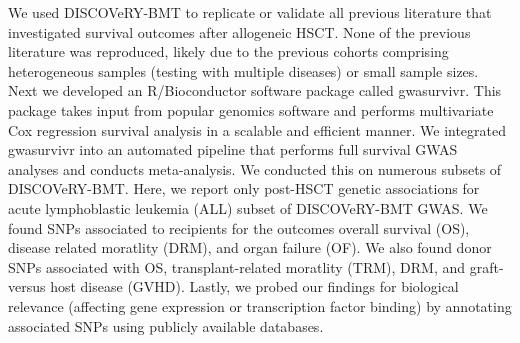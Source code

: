 \documentclass[]{DissertateOSU}
\begin{document}
We used DISCOVeRY-BMT to replicate or validate all previous literature
that investigated survival outcomes after allogeneic HSCT. None of the
previous literature was reproduced, likely due to the previous cohorts
comprising heterogeneous samples (testing with multiple diseases) or
small sample sizes. Next we developed an R/Bioconductor software package
called gwasurvivr. This package takes input from popular genomics
software and performs multivariate Cox regression survival analysis in a
scalable and efficient manner. We integrated gwasurvivr into an
automated pipeline that performs full survival GWAS analyses and
conducts meta-analysis. We conducted this on numerous subsets of
DISCOVeRY-BMT. Here, we report only post-HSCT genetic associations for
acute lymphoblastic leukemia (ALL) subset of DISCOVeRY-BMT GWAS. We
found SNPs associated to recipients for the outcomes overall survival
(OS), disease related moratlity (DRM), and organ failure (OF). We also
found donor SNPs associated with OS, transplant-related moratlity (TRM),
DRM, and graft-versus host disease (GVHD). Lastly, we probed our
findings for biological relevance (affecting gene expression or
transcription factor binding) by annotating associated SNPs using
publicly available databases.


\newpage

\pagestyle{plain} \fancyhead[L]{} \fancyhead[R]{}
\fancyfoot[C]{\thepage} 
\end{document}
